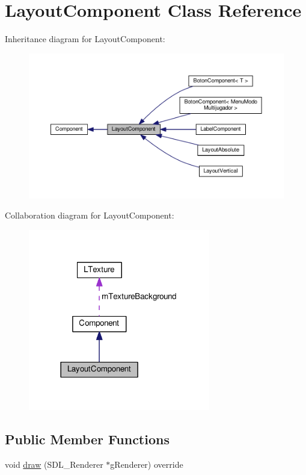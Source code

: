 \hypertarget{class_layout_component}{}\section{Layout\+Component Class Reference}
\label{class_layout_component}


Inheritance diagram for Layout\+Component\+:
\nopagebreak
\begin{figure}[H]
\begin{center}
\leavevmode
\includegraphics[width=350pt]{class_layout_component__inherit__graph}
\end{center}
\end{figure}


Collaboration diagram for Layout\+Component\+:\nopagebreak
\begin{figure}[H]
\begin{center}
\leavevmode
\includegraphics[width=225pt]{class_layout_component__coll__graph}
\end{center}
\end{figure}
\subsection*{Public Member Functions}
\begin{DoxyCompactItemize}
\item 
void \hyperlink{class_layout_component_a0ee8a3146a3258a9886472b86cf34a16}{draw} (S\+D\+L\+\_\+\+Renderer $\ast$g\+Renderer) override
\end{DoxyCompactItemize}

